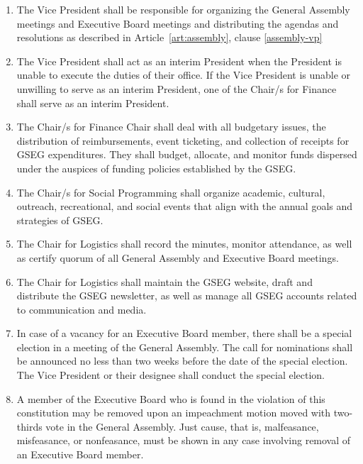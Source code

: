 \begin{enumerate}[label=\Alph*.]
\item The Vice President shall be responsible for organizing the General Assembly meetings and Executive Board meetings and distributing the agendas and resolutions as described in Article~\ref{art:assembly}, clause \ref{assembly-vp}

\item The Vice President shall act as an interim President when the President is unable to execute the duties of their office. If the Vice President is unable or unwilling to serve as an interim President, one of the Chair/s for Finance shall serve as an interim President.

\item The Chair/s for Finance Chair shall deal with all budgetary issues, the distribution of reimbursements, event ticketing, and collection of receipts for GSEG expenditures. They shall budget, allocate, and monitor funds dispersed under the auspices of funding policies established by the GSEG.

\item The Chair/s for Social Programming shall organize academic, cultural, outreach, recreational, and social events that align with the annual goals and strategies of GSEG. 

\item The Chair for Logistics shall record the minutes, monitor attendance, as well as certify quorum of all General Assembly and Executive Board meetings.

\item The Chair for Logistics shall maintain the GSEG website, draft and distribute the GSEG newsletter, as well as manage all GSEG accounts related to communication and media. 

\item In case of a vacancy for an Executive Board member, there shall be a special election in a meeting of the General Assembly. The call for nominations shall be announced no less than two weeks before the date of the special election. The Vice President or their designee shall conduct the special election.

\item A member of the Executive Board who is found in the violation of this constitution may be removed upon an impeachment motion moved with two-thirds vote in the General Assembly. Just cause, that is, malfeasance, misfeasance, or nonfeasance, must be shown in any case involving removal of an Executive Board member.

\end{enumerate}


